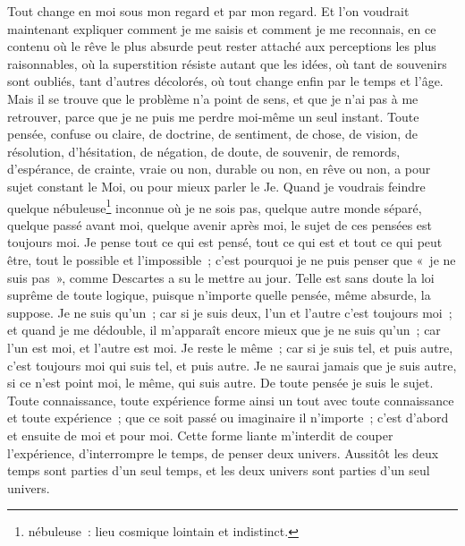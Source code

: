 	{Tout change en moi sous mon regard et par mon regard. Et l'on voudrait maintenant expliquer comment je me saisis et comment je me reconnais, en ce contenu où le rêve le plus absurde peut rester attaché aux perceptions les plus raisonnables, où la superstition résiste autant que les idées, où tant de souvenirs sont oubliés, tant d'autres décolorés, où tout change enfin par le temps et l'âge. Mais il se trouve que le problème n'a point de sens, et que je n'ai pas à me retrouver, parce que je ne puis me perdre moi-même un seul instant. Toute pensée, confuse ou claire, de doctrine, de sentiment, de chose, de vision, de résolution, d'hésitation, de négation, de doute, de souvenir, de remords, d'espérance, de crainte, vraie ou non, durable ou non, en rêve ou non, a pour sujet constant le Moi, ou pour mieux parler le Je. Quand je voudrais feindre quelque nébuleuse\footnote{nébuleuse~: lieu cosmique lointain et indistinct.} inconnue où je ne sois pas, quelque autre monde séparé, quelque passé avant moi, quelque avenir après moi, le sujet de ces pensées est toujours moi. Je pense tout ce qui est pensé, tout ce qui est et tout ce qui peut être, tout le possible et l'impossible~; c'est pourquoi je ne puis penser que «~je ne suis pas~», comme Descartes a su le mettre au jour. Telle est sans doute la loi suprême de toute logique, puisque n'importe quelle pensée, même absurde, la suppose. Je ne suis qu'un~; car si je suis deux, l'un et l'autre c'est toujours moi~; et quand je me dédouble, il m'apparaît encore mieux que je ne suis qu'un~; car l'un est moi, et l'autre est moi. Je reste le même~; car si je suis tel, et puis autre, c'est toujours moi qui suis tel, et puis autre. Je ne saurai jamais que je suis autre, si ce n'est point moi, le même, qui suis autre. De toute pensée je suis le sujet. Toute connaissance, toute expérience forme ainsi un tout avec toute connaissance et toute expérience~; que ce soit passé ou imaginaire il n'importe~; c'est d'abord et ensuite de moi et pour moi. Cette forme liante m'interdit de couper l'expérience, d'interrompre le temps, de penser deux univers. Aussitôt les deux temps sont parties d'un seul temps, et les deux univers sont parties d'un seul univers.
	}
	
